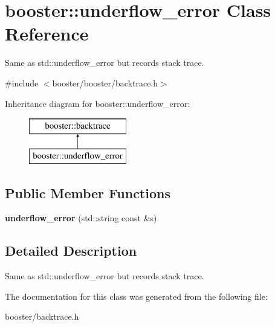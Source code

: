 \section{booster\-:\-:underflow\-\_\-error \-Class \-Reference}
\label{classbooster_1_1underflow__error}


\-Same as std\-::underflow\-\_\-error but records stack trace.  




{\ttfamily \#include $<$booster/booster/backtrace.\-h$>$}

\-Inheritance diagram for booster\-:\-:underflow\-\_\-error\-:\begin{figure}[H]
\begin{center}
\leavevmode
\includegraphics[height=2.000000cm]{classbooster_1_1underflow__error}
\end{center}
\end{figure}
\subsection*{\-Public \-Member \-Functions}
\begin{DoxyCompactItemize}
\item 
{\bfseries underflow\-\_\-error} (std\-::string const \&s)\label{classbooster_1_1underflow__error_ac5ae1a55ac50a0e55af0f6610c4d8dc1}

\end{DoxyCompactItemize}


\subsection{\-Detailed \-Description}
\-Same as std\-::underflow\-\_\-error but records stack trace. 

\-The documentation for this class was generated from the following file\-:\begin{DoxyCompactItemize}
\item 
booster/backtrace.\-h\end{DoxyCompactItemize}
